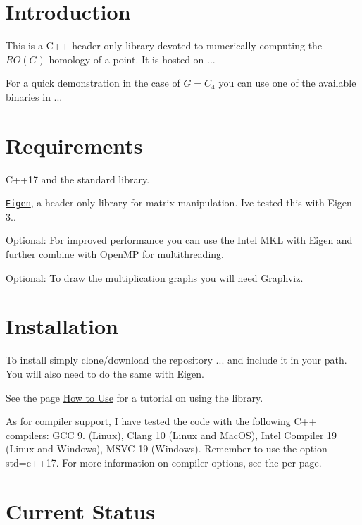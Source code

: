 \hypertarget{index_intro}{}\section{Introduction}\label{index_intro}
This is a C++ header only library devoted to numerically computing the $RO(G)$ homology of a point. It is hosted on ...

For a quick demonstration in the case of $G=C_4$ you can use one of the available binaries in ...\hypertarget{index_req}{}\section{Requirements}\label{index_req}

\begin{DoxyItemize}
\item C++17 and the standard library.
\item \href{ http://eigen.tuxfamily.org/index.php?title=Main_Page}{\tt Eigen}, a header only library for matrix manipulation. I\textquotesingle{}ve tested this with Eigen 3..
\item Optional\+: For improved performance you can use the Intel M\+KL with Eigen and further combine with Open\+MP for multithreading.
\item Optional\+: To draw the multiplication graphs you will need Graphviz.
\end{DoxyItemize}\hypertarget{index_install}{}\section{Installation}\label{index_install}

\begin{DoxyItemize}
\item To install simply clone/download the repository ... and include it in your path. You will also need to do the same with Eigen.
\item See the page \hyperlink{use}{How to Use} for a tutorial on using the library.
\item As for compiler support, I have tested the code with the following C++ compilers\+: G\+CC 9. (Linux), Clang 10 (Linux and Mac\+OS), Intel Compiler 19 (Linux and Windows), M\+S\+VC 19 (Windows). Remember to use the option {\ttfamily -\/std=c++17}. For more information on compiler options, see the per page.
\end{DoxyItemize}\hypertarget{index_status}{}\section{Current Status}\label{index_status}

